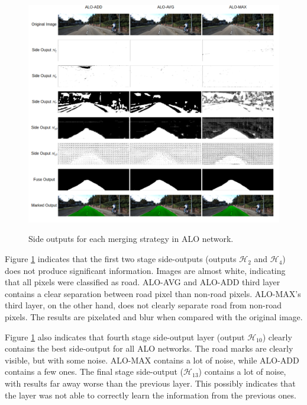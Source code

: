 

\begin{figure}
  \caption{Side outputs for each merging strategy in ALO network.}
  \centering
  \includegraphics[width=1.0\textwidth]{figures/falreis/side_outputs.png}
  \label{fig:side_outputs}
\end{figure}

 

Figure \ref{fig:side_outputs} indicates that the first two stage side-outputs (outputs $\mathcal{H}_2$ and $\mathcal{H}_4$) does not produce significant information. Images are almost white, indicating that all pixels were classified as road. ALO-AVG and ALO-ADD third layer contains a clear separation between road pixel than non-road pixels. ALO-MAX's third layer, on the other hand, does not clearly separate road from non-road pixels. The results are pixelated and blur when compared with the original image.

Figure \ref{fig:side_outputs} also indicates that fourth stage side-output layer (output $\mathcal{H}_{10}$) clearly contains the best side-output for all ALO networks. The road marks are clearly visible, but with some noise. ALO-MAX contains a lot of noise, while ALO-ADD contains a few ones. The final stage side-output ($\mathcal{H}_{13}$) contains a lot of noise, with results far away worse than the previous layer. This possibly indicates that the layer was not able to correctly learn the information from the previous ones.

